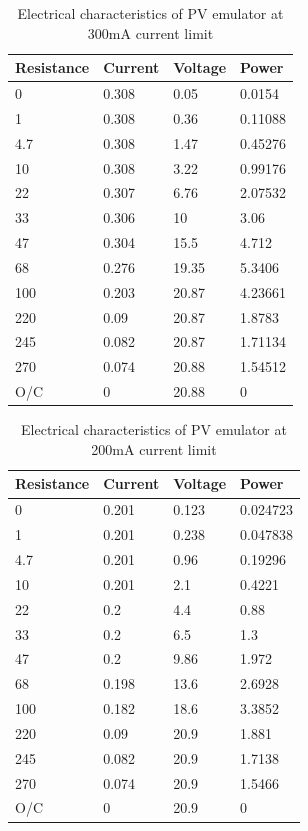 \documentclass[]{article}
\begin{document}
				\begin{table}[H]
					\centering
					\begin{tabular}{|l|l|l|l|}
						\hline		 					
						Resistance & Current & Voltage & Power \\ \hline
						0 & 0.308 & 0.05 & 0.0154 \\ \hline
						1 & 0.308 & 0.36 & 0.11088 \\ \hline
						4.7 & 0.308 & 1.47 & 0.45276 \\ \hline
						10 & 0.308 & 3.22 & 0.99176 \\ \hline
						22 & 0.307 & 6.76 & 2.07532 \\ \hline
						33 & 0.306 & 10 & 3.06 \\ \hline
						47 & 0.304 & 15.5 & 4.712 \\ \hline
						68 & 0.276 & 19.35 & 5.3406 \\ \hline
						100 & 0.203 & 20.87 & 4.23661 \\ \hline
						220 & 0.09 & 20.87 & 1.8783 \\ \hline
						245 & 0.082 & 20.87 & 1.71134 \\ \hline
						270 & 0.074 & 20.88 & 1.54512 \\ \hline
						O/C & 0 & 20.88 & 0 \\ \hline		 					
					\end{tabular}
					\caption{Electrical characteristics of PV emulator at 300mA current limit}
					\label{tbl:lab4_300emu}
				\end{table}
 				\begin{table}[H]
 					\centering
 					\begin{tabular}{|l|l|l|l|}
 						\hline	 						
 						Resistance & Current & Voltage & Power \\ \hline
 						0 & 0.201 & 0.123 & 0.024723 \\ \hline
 						1 & 0.201 & 0.238 & 0.047838 \\ \hline
 						4.7 & 0.201 & 0.96 & 0.19296 \\ \hline
 						10 & 0.201 & 2.1 & 0.4221 \\ \hline
 						22 & 0.2 & 4.4 & 0.88 \\ \hline
 						33 & 0.2 & 6.5 & 1.3 \\ \hline
 						47 & 0.2 & 9.86 & 1.972 \\ \hline
 						68 & 0.198 & 13.6 & 2.6928 \\ \hline
 						100 & 0.182 & 18.6 & 3.3852 \\ \hline
 						220 & 0.09 & 20.9 & 1.881 \\ \hline
 						245 & 0.082 & 20.9 & 1.7138 \\ \hline
 						270 & 0.074 & 20.9 & 1.5466 \\ \hline
 						O/C & 0 & 20.9 & 0 \\ \hline	 						
 					\end{tabular}
		 			\caption{Electrical characteristics of PV emulator at 200mA current limit}
		 			\label{tbl:lab4_200emu}
 				\end{table}
\end{document}
